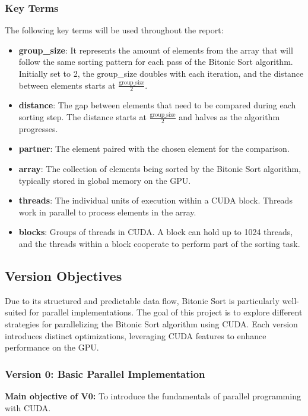\documentclass[a4paper,12pt]{article}
\begin{document}
\subsubsection*{Key Terms}
The following key terms will be used throughout the report:
\begin{itemize}
    \item \textbf{group\_size}: It represents the amount of elements from the array that will follow the same sorting pattern for each pass of the Bitonic Sort algorithm. Initially set to 2, the group\_size doubles with each iteration, and the distance between elements starts at \(\frac{\text{group\_size}}{2}\). 
    \item \textbf{distance}: The gap between elements that need to be compared during each sorting step. The distance starts at \(\frac{\text{group\_size}}{2}\) and halves as the algorithm progresses.
    \item \textbf{partner}: The element paired with the chosen element for the comparison.
    \item \textbf{array}: The collection of elements being sorted by the Bitonic Sort algorithm, typically stored in global memory on the GPU.
    \item \textbf{threads}: The individual units of execution within a CUDA block. Threads work in parallel to process elements in the array.
    \item \textbf{blocks}: Groups of threads in CUDA. A block can hold up to 1024 threads, and the threads within a block cooperate to perform part of the sorting task.
\end{itemize}

\subsection{Version Objectives}

Due to its structured and predictable data flow, Bitonic Sort is particularly well-suited for parallel implementations. The goal of this project is to explore different strategies for parallelizing the Bitonic Sort algorithm using CUDA. Each version introduces distinct optimizations, leveraging CUDA features to enhance performance on the GPU.

\subsubsection{Version 0: Basic Parallel Implementation}

\textbf{Main objective of V0:} To introduce the fundamentals of parallel programming with CUDA.
\end{document}
